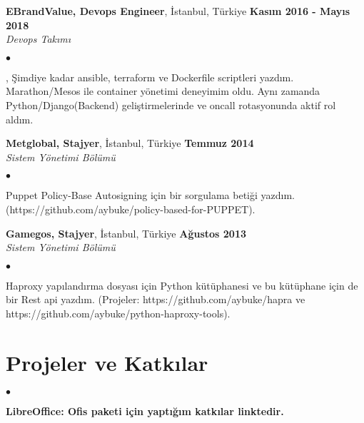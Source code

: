 \documentclass[margin,line]{res}
\newenvironment{list2}{
  \begin{list}{$\bullet$}{%
      \setlength{\itemsep}{0in}
      \setlength{\parsep}{0in} \setlength{\parskip}{0in}
      \setlength{\topsep}{0in} \setlength{\partopsep}{0in}
      \setlength{\leftmargin}{0.1in}}}{\end{list}}
\begin{document}
\begin{resume}
{\bf EBrandValue, Devops Engineer}, \.{I}stanbul, T\"{u}rkiye \hfill {\bf Kas{\i}m 2016 - May{\i}s 2018}\\

\vspace{-.7cm}
{\em Devops Tak{\i}m{\i} }
\vspace*{+.05in}
\begin{list2}
\item , \c{S}imdiye kadar ansible, terraform ve Dockerfile scriptleri yazd{\i}m. Marathon/Mesos ile container y\"{o}netimi deneyimim oldu. Ayn{\i} zamanda Python/Django(Backend) geli\c{s}tirmelerinde ve oncall rotasyonunda aktif rol ald{\i}m.

\end{list2}

{\bf Metglobal, Stajyer}, \.{I}stanbul, T\"{u}rkiye \hfill {\bf Temmuz 2014}\\

\vspace{-.7cm}
{\em Sistem Y\"{o}netimi B\"{o}l\"{u}m\"{u} }
\vspace*{+.05in}
\begin{list2}
\item Puppet Policy-Base Autosigning i\c{c}in bir sorgulama beti\u{g}i yazd{\i}m. (https://github.com/aybuke/policy-based-for-PUPPET).
\end{list2}

{\bf Gamegos, Stajyer}, \.{I}stanbul, T\"{u}rkiye \hfill {\bf A\u{g}ustos 2013}\\

\vspace{-.7cm}
{\em Sistem Y\"{o}netimi B\"{o}l\"{u}m\"{u} }
\vspace*{+.05in}
\begin{list2}
\item Haproxy yap{\i}land{\i}rma dosyas{\i} i\c{c}in Python k\"{u}t\"{u}phanesi ve bu k\"{u}t\"{u}phane i\c{c}in de bir Rest api yazd{\i}m. (Projeler: https://github.com/aybuke/hapra ve https://github.com/aybuke/python-haproxy-tools).
\end{list2}

\section{\sc Projeler ve Katk{\i}lar}
\begin{list2}
\item {\bf LibreOffice: Ofis paketi i\c{c}in yapt{\i}\u{g}{\i}m katk{\i}lar linktedir.}


\end{list2}
\end{resume}
\end{document}
